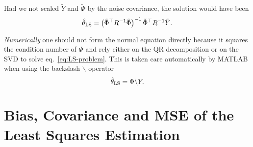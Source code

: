 Had we not scaled $\tilde{Y}$ and $\tilde{\Phi}$ by the noise covariance, the solution would have been
\begin{equation*}
  \hat{\theta}_\textrm{LS} = \left(\tilde{\Phi}^\top R^{-1}\tilde{\Phi}\right)^{-1} \tilde{\Phi}^\top R^{-1} \tilde{Y}.
\end{equation*}

\emph{Numerically} one should not form the normal equation directly because it squares the condition number of $\Phi$ and rely either on the QR decomposition or on the SVD to solve eq.~\eqref{eq:LS-problem}.
This is taken care automatically by MATLAB when using the backslash $\backslash$ operator
\begin{equation}
  \label{eq:LS-numerical-solution}
  \hat{\theta}_\textrm{LS} = \Phi \backslash Y.
\end{equation}

\section{Bias, Covariance and MSE of the Least Squares Estimation}
\label{sec:bias-variance-MSE-LS-estimation}

